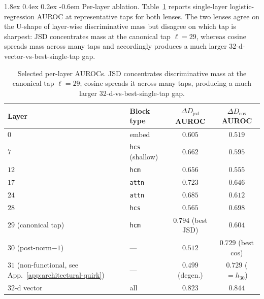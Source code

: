 \documentclass{article}
\makeatletter
\renewcommand\paragraph{\@startsection{paragraph}{4}{\z@}%
  {1.8ex \@plus 0.4ex \@minus 0.2ex}%
  {-0.6em}%
{\normalfont\normalsize\bfseries}}
\theoremstyle{plain}
\theoremstyle{definition}
\theoremstyle{remark}
\newcommand{\DDcos}{\Delta D_{\cos}}
\newcommand{\DDjsd}{\Delta D_{\mathrm{jsd}}}
\makeatother
\begin{document}
\paragraph{Per-layer ablation.} Table~\ref{tab:per-layer} reports
single-layer logistic-regression AUROC at representative taps for both
lenses. The two lenses agree on the U-shape of layer-wise discriminative
mass but disagree on which tap is sharpest: JSD concentrates mass at the
canonical tap $\ell\!=\!29$, whereas cosine spreads mass across many
taps and accordingly produces a much larger 32-d-vector-vs-best-single-tap
gap.

\begin{table}[!htbp]
  \caption{Selected per-layer AUROCs. JSD concentrates discriminative
    mass at the canonical tap $\ell\!=\!29$; cosine spreads it across many
  taps, producing a much larger 32-d-vs-best-single-tap gap.}
  \label{tab:per-layer}
  \centering
  \small
  \begin{tabular}{@{}llcc@{}}
    \toprule
    Layer & Block type & $\DDjsd$ AUROC & $\DDcos$ AUROC \\
    \midrule
    $0$  & embed                    & $0.605$ & $0.519$ \\
    $7$  & \texttt{hcs} (shallow)   & $0.662$ & $0.595$ \\
    $12$ & \texttt{hcm}             & $0.656$ & $0.555$ \\
    $17$ & \texttt{attn}            & $0.723$ & $0.646$ \\
    $24$ & \texttt{attn}            & $0.685$ & $0.612$ \\
    $28$ & \texttt{hcs}             & $0.565$ & $0.698$ \\
    $29$ (canonical tap) & \texttt{hcm}
    & $\mathbf{0.794}$ (best JSD) & $0.604$ \\
    $30$ (post-norm$-1$)  & ---     & $0.512$ & $\mathbf{0.729}$ (best cos) \\
    $31$ (non-functional, see App.~\ref{app:architectural-quirk}) & ---
    & $0.499$ (degen.) & $0.729$ ($=h_{30}$) \\
    \midrule
    32-d vector & all                 & $0.823$ & $0.844$ \\
    \bottomrule
  \end{tabular}
\end{table}
\end{document}
